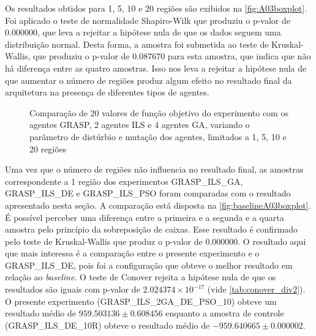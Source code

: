 Os resultados obtidos para 1, 5, 10 e 20 regiões são exibidos na \autoref{fig:A03boxplot}. Foi aplicado o teste de normalidade Shapiro-Wilk que produziu o p-valor de $0.000000$, que leva a rejeitar a hipótese nula de que os dados seguem uma distribuição normal. Desta forma, a amostra foi submetida ao teste de Kruskal-Wallis, que produziu o p-valor de $0.087670$ para esta amostra, que indica que não há diferença entre as quatro amostras. Isso nos leva a rejeitar a hipótese nula de que aumentar o número de regiões produz algum efeito no resultado final da arquitetura na presença de diferentes tipos de agentes. 

\begin{figure}
    \centering
    \caption{Comparação de 20 valores de função objetivo do experimento com os agentes GRASP, 2 agentes ILS e 4 agentes GA, variando o parâmetro de distúrbio e mutação dos agentes, limitados a 1, 5, 10 e 20 regiões}
    
    \label{fig:baselineA03boxplot}
\end{figure}

Uma vez que o número de  regiões não influencia no resultado final, as amostras correspondente a 1 região dos experimentos GRASP\_ILS\_GA, GRASP\_ILS\_DE e GRASP\_ILS\_PSO foram comparadas com o resultado apresentado nesta seção. A comparação está disposta na \autoref{fig:baselineA03boxplot}. É possível perceber uma diferença entre a primeira e a segunda e a quarta amostra pelo princípio da sobreposição de caixas. Esse resultado é confirmado pelo teste de Kruskal-Wallis que produz o p-valor de $0.000000$. O resultado aqui que mais interessa é a comparação entre o presente experimento e o  GRASP\_ILS\_DE, pois foi a configuração que obteve o melhor resultado em relação ao \textit{baseline}. O teste de Conover rejeita a hipótese nula de que os resultados são iguais com p-valor de $2.024374 \times 10^{-17}$ (vide \autoref{tab:conover_div2}). O presente experimento (GRASP\_ILS\_2GA\_DE\_PSO\_10) obteve um resultado médio de $959.503136 \pm 0.608456$ enquanto a amostra de controle (GRASP\_ILS\_DE\_10R) obteve o resultado médio de $-959.640665 \pm 0.000002$. 

